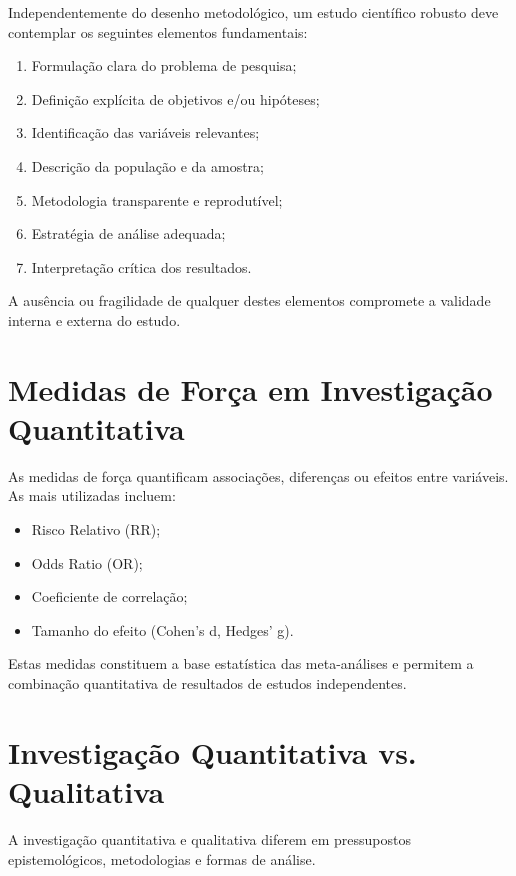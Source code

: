 \documentclass[12pt,a4paper]{article}
\begin{document}
Independentemente do desenho metodológico, um estudo científico robusto deve contemplar os seguintes elementos fundamentais:
\begin{enumerate}
    \item Formulação clara do problema de pesquisa;
    \item Definição explícita de objetivos e/ou hipóteses;
    \item Identificação das variáveis relevantes;
    \item Descrição da população e da amostra;
    \item Metodologia transparente e reprodutível;
    \item Estratégia de análise adequada;
    \item Interpretação crítica dos resultados.
\end{enumerate}

A ausência ou fragilidade de qualquer destes elementos compromete a validade interna e externa do estudo.

\section{Medidas de Força em Investigação Quantitativa}

As medidas de força quantificam associações, diferenças ou efeitos entre variáveis. As mais utilizadas incluem:
\begin{itemize}
    \item Risco Relativo (RR);
    \item Odds Ratio (OR);
    \item Coeficiente de correlação;
    \item Tamanho do efeito (Cohen’s d, Hedges’ g).
\end{itemize}

Estas medidas constituem a base estatística das meta-análises e permitem a combinação quantitativa de resultados de estudos independentes.

\section{Investigação Quantitativa vs. Qualitativa}

A investigação quantitativa e qualitativa diferem em pressupostos epistemológicos, metodologias e formas de análise.
\end{document}
